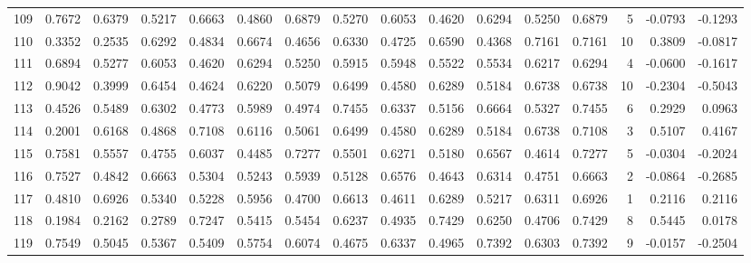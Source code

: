 \begin{tabular}{lrrrrrrrrrrrrrrr}
109 &      0.7672 &  0.6379 &  0.5217 &  0.6663 &  0.4860 &  0.6879 &  0.5270 &  0.6053 &  0.4620 &  0.6294 &   0.5250 &     0.6879 &      5 &                   -0.0793 &                    -0.1293 \\
110 &      0.3352 &  0.2535 &  0.6292 &  0.4834 &  0.6674 &  0.4656 &  0.6330 &  0.4725 &  0.6590 &  0.4368 &   0.7161 &     0.7161 &     10 &                    0.3809 &                    -0.0817 \\
111 &      0.6894 &  0.5277 &  0.6053 &  0.4620 &  0.6294 &  0.5250 &  0.5915 &  0.5948 &  0.5522 &  0.5534 &   0.6217 &     0.6294 &      4 &                   -0.0600 &                    -0.1617 \\
112 &      0.9042 &  0.3999 &  0.6454 &  0.4624 &  0.6220 &  0.5079 &  0.6499 &  0.4580 &  0.6289 &  0.5184 &   0.6738 &     0.6738 &     10 &                   -0.2304 &                    -0.5043 \\
113 &      0.4526 &  0.5489 &  0.6302 &  0.4773 &  0.5989 &  0.4974 &  0.7455 &  0.6337 &  0.5156 &  0.6664 &   0.5327 &     0.7455 &      6 &                    0.2929 &                     0.0963 \\
114 &      0.2001 &  0.6168 &  0.4868 &  0.7108 &  0.6116 &  0.5061 &  0.6499 &  0.4580 &  0.6289 &  0.5184 &   0.6738 &     0.7108 &      3 &                    0.5107 &                     0.4167 \\
115 &      0.7581 &  0.5557 &  0.4755 &  0.6037 &  0.4485 &  0.7277 &  0.5501 &  0.6271 &  0.5180 &  0.6567 &   0.4614 &     0.7277 &      5 &                   -0.0304 &                    -0.2024 \\
116 &      0.7527 &  0.4842 &  0.6663 &  0.5304 &  0.5243 &  0.5939 &  0.5128 &  0.6576 &  0.4643 &  0.6314 &   0.4751 &     0.6663 &      2 &                   -0.0864 &                    -0.2685 \\
117 &      0.4810 &  0.6926 &  0.5340 &  0.5228 &  0.5956 &  0.4700 &  0.6613 &  0.4611 &  0.6289 &  0.5217 &   0.6311 &     0.6926 &      1 &                    0.2116 &                     0.2116 \\
118 &      0.1984 &  0.2162 &  0.2789 &  0.7247 &  0.5415 &  0.5454 &  0.6237 &  0.4935 &  0.7429 &  0.6250 &   0.4706 &     0.7429 &      8 &                    0.5445 &                     0.0178 \\
119 &      0.7549 &  0.5045 &  0.5367 &  0.5409 &  0.5754 &  0.6074 &  0.4675 &  0.6337 &  0.4965 &  0.7392 &   0.6303 &     0.7392 &      9 &                   -0.0157 &                    -0.2504 \\

\end{tabular}
